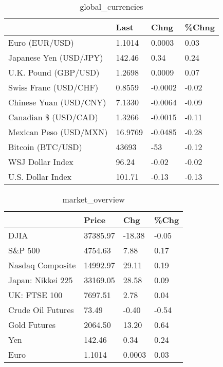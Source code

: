 \documentclass{article}%
\begin{document}
%


\begin{table}[htbp]%
\caption{global\_currencies}%
\centering%
\begin{adjustbox}{width=1\textwidth}%
\begin{tabular}{llll}
\toprule
                       &    Last &    Chng & \%Chng \\
\midrule
        Euro (EUR/USD) &  1.1014 &  0.0003 &  0.03 \\
Japanese Yen (USD/JPY) &  142.46 &    0.34 &  0.24 \\
  U.K. Pound (GBP/USD) &  1.2698 &  0.0009 &  0.07 \\
 Swiss Franc (USD/CHF) &  0.8559 & -0.0002 & -0.02 \\
Chinese Yuan (USD/CNY) &  7.1330 & -0.0064 & -0.09 \\
  Canadian \$ (USD/CAD) &  1.3266 & -0.0015 & -0.11 \\
Mexican Peso (USD/MXN) & 16.9769 & -0.0485 & -0.28 \\
     Bitcoin (BTC/USD) &   43693 &     -53 & -0.12 \\
      WSJ Dollar Index &   96.24 &   -0.02 & -0.02 \\
     U.S. Dollar Index &  101.71 &   -0.13 & -0.13 \\
\bottomrule
\end{tabular}
%
\end{adjustbox}%
\end{table}

%


\begin{table}[htbp]%
\caption{market\_overview}%
\centering%
\begin{adjustbox}{width=1\textwidth}%
\begin{tabular}{llll}
\toprule
                  &    Price &    Chg &  \%Chg \\
\midrule
             DJIA & 37385.97 & -18.38 & -0.05 \\
          S\&P 500 &  4754.63 &   7.88 &  0.17 \\
 Nasdaq Composite & 14992.97 &  29.11 &  0.19 \\
Japan: Nikkei 225 & 33169.05 &  28.58 &  0.09 \\
     UK: FTSE 100 &  7697.51 &   2.78 &  0.04 \\
Crude Oil Futures &    73.49 &  -0.40 & -0.54 \\
     Gold Futures &  2064.50 &  13.20 &  0.64 \\
              Yen &   142.46 &   0.34 &  0.24 \\
             Euro &   1.1014 & 0.0003 &  0.03 \\
\bottomrule
\end{tabular}
%
\end{adjustbox}%
\end{table}

%
\end{document}
